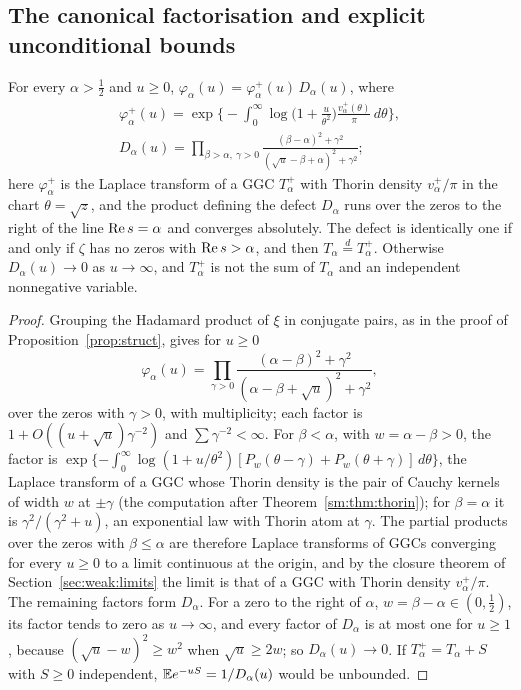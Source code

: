 \subsection{The canonical factorisation and explicit unconditional bounds}\label{ag:sec:factor}

\begin{proposition}\label{ag:prop:factor}
For every $\alpha>\frac12$ and $u\ge0$, $\varphi_\alpha(u)=\varphi_\alpha^+(u)\,D_\alpha(u)$, where
\begin{gather*}
\varphi_\alpha^+(u)=\exp\Big\{-\int_0^\infty\log\Big(1+\frac u{\theta^2}\Big)\frac{v_\alpha^+(\theta)}\pi\,d\theta\Big\},\\
D_\alpha(u)=\prod_{\beta>\alpha,\ \gamma>0}\frac{(\beta-\alpha)^2+\gamma^2}{(\sqrt u-\beta+\alpha)^2+\gamma^2};
\end{gather*}
here $\varphi_\alpha^+$ is the Laplace transform of a GGC $T_\alpha^+$ with Thorin density $v_\alpha^+/\pi$ in the chart $\theta=\sqrt z$, and the product defining the defect $D_\alpha$ runs over the zeros to the right of the line $\operatorname{Re} s=\alpha$ and converges absolutely. The defect is identically one if and only if $\zeta$ has no zeros with $\operatorname{Re} s>\alpha$, and then $T_\alpha\stackrel d=T_\alpha^+$. Otherwise $D_\alpha(u)\to0$ as $u\to\infty$, and $T_\alpha^+$ is not the sum of $T_\alpha$ and an independent nonnegative variable.
\end{proposition}

\begin{proof}
Grouping the Hadamard product of $\xi$ in conjugate pairs, as in the proof of Proposition~\ref{prop:struct}, gives for $u\ge0$
\[
\varphi_\alpha(u)=\prod_{\gamma>0}\frac{(\alpha-\beta)^2+\gamma^2}{(\alpha-\beta+\sqrt u)^2+\gamma^2},
\]
over the zeros with $\gamma>0$, with multiplicity; each factor is $1+O((u+\sqrt u)\gamma^{-2})$ and $\sum\gamma^{-2}<\infty$. For $\beta<\alpha$, with $w=\alpha-\beta>0$, the factor is $\exp\{-\int_0^\infty\log(1+u/\theta^2)[P_w(\theta-\gamma)+P_w(\theta+\gamma)]\,d\theta\}$, the Laplace transform of a GGC whose Thorin density is the pair of Cauchy kernels of width $w$ at $\pm\gamma$ (the computation after Theorem~\ref{sm:thm:thorin}); for $\beta=\alpha$ it is $\gamma^2/(\gamma^2+u)$, an exponential law with Thorin atom at $\gamma$. The partial products over the zeros with $\beta\le\alpha$ are therefore Laplace transforms of GGCs converging for every $u\ge0$ to a limit continuous at the origin, and by the closure theorem of Section~\ref{sec:weak:limits} the limit is that of a GGC with Thorin density $v_\alpha^+/\pi$. The remaining factors form $D_\alpha$. For a zero to the right of $\alpha$, $w=\beta-\alpha\in(0,\frac12)$, its factor tends to zero as $u\to\infty$, and every factor of $D_\alpha$ is at most one for $u\ge1$, because $(\sqrt u-w)^2\ge w^2$ when $\sqrt u\ge2w$; so $D_\alpha(u)\to0$. If $T_\alpha^+=T_\alpha+S$ with $S\ge0$ independent, $\mathbb{E} e^{-uS}=1/D_\alpha(u)$ would be unbounded.
\end{proof}

